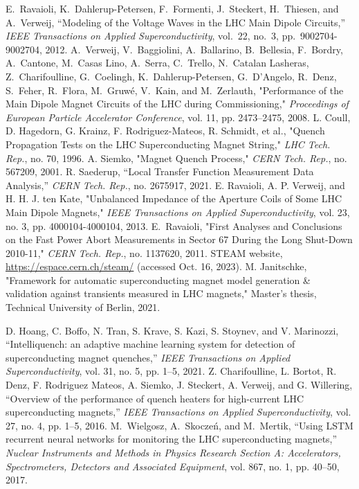 \documentclass[lettersize,journal]{IEEEtran}
\begin{document}
\begin{thebibliography}{1}
E.~Ravaioli, K.~Dahlerup-Petersen, F.~Formenti, J.~Steckert, H.~Thiesen, and A.~Verweij, ``Modeling of the Voltage Waves in the LHC Main Dipole Circuits,'' \emph{IEEE Transactions on Applied Superconductivity}, vol.~22, no.~3, pp.~9002704-9002704, 2012.
A.~Verweij, V.~Baggiolini, A.~Ballarino, B.~Bellesia, F.~Bordry, A.~Cantone, M.~Casas Lino, A.~Serra, C.~Trello, N.~Catalan Lasheras, Z.~Charifoulline, G.~Coelingh, K.~Dahlerup-Petersen, G.~D'Angelo, R.~Denz, S.~Feher, R.~Flora, M.~Gruwé, V.~Kain, and M.~Zerlauth, "Performance of the Main Dipole Magnet Circuits of the LHC during Commissioning," \textit{Proceedings of European Particle Accelerator Conference}, vol. 11, pp. 2473–2475, 2008.
L. Coull, D. Hagedorn, G. Krainz, F. Rodriguez-Mateos, R. Schmidt, et al., "Quench Propagation Tests on the LHC Superconducting Magnet String," \emph{LHC Tech. Rep.}, no. 70, 1996.
A. Siemko, "Magnet Quench Process," \emph{CERN Tech. Rep.}, no. 567209, 2001.
R. Saederup, ``Local Transfer Function Measurement Data Analysis,'' \emph{CERN Tech. Rep.}, no. 2675917, 2021.
E. Ravaioli, A. P. Verweij, and H. H. J. ten Kate, "Unbalanced Impedance of the Aperture Coils of Some LHC Main Dipole Magnets," \textit{IEEE Transactions on Applied Superconductivity}, vol. 23, no. 3, pp. 4000104-4000104, 2013.
E.~Ravaioli, "First Analyses and Conclusions on the Fast Power Abort Measurements in Sector 67 During the Long Shut-Down 2010-11," \emph{CERN Tech. Rep.}, no. 1137620, 2011.
STEAM website, \url{https://espace.cern.ch/steam/} (accessed Oct. 16, 2023).
M. Janitschke, "Framework for automatic superconducting magnet model generation \& validation against transients measured in LHC magnets," Master’s thesis, Technical University of Berlin, 2021.


D. Hoang, C. Boffo, N. Tran, S. Krave, S. Kazi, S. Stoynev, and V. Marinozzi, ``Intelliquench: an adaptive machine learning system for detection of superconducting magnet quenches,'' \textit{IEEE Transactions on Applied Superconductivity}, vol. 31, no. 5, pp. 1--5, 2021.
Z. Charifoulline, L. Bortot, R. Denz, F. Rodriguez Mateos, A. Siemko, J. Steckert, A. Verweij, and G. Willering, ``Overview of the performance of quench heaters for high-current LHC superconducting magnets,'' \textit{IEEE Transactions on Applied Superconductivity}, vol. 27, no. 4, pp. 1--5, 2016.
M.~Wielgosz, A.~Skoczeń, and M.~Mertik, ``Using {LSTM} recurrent neural networks for monitoring the {LHC} superconducting magnets,'' \textit{Nuclear Instruments and Methods in Physics Research Section A: Accelerators, Spectrometers, Detectors and Associated Equipment}, vol. 867, no. 1, pp. 40--50, 2017.


\end{thebibliography}
\end{document}

